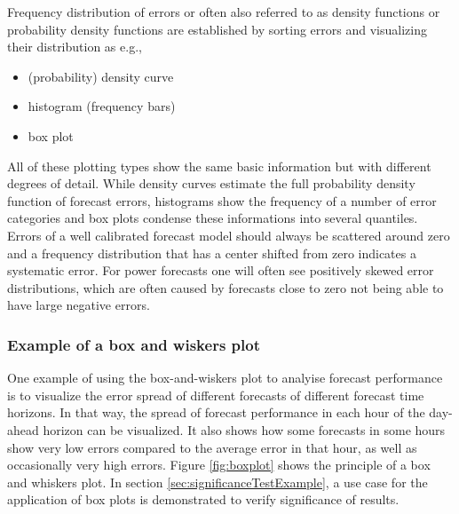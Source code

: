 Frequency distribution of errors or often also referred to as density functions or probability density functions are established by sorting errors and visualizing their distribution as e.g.,  
\begin{itemize}
    \item (probability) density curve 
    \item histogram (frequency bars)  
    \item box plot
\end{itemize}
All of these plotting types show the same basic information but with different degrees of detail.
While density curves estimate the full probability density function of forecast errors, histograms show the frequency of a number of error categories and box plots condense these informations into several quantiles.
Errors of a well calibrated forecast model should always be scattered around zero and a frequency distribution that has a center shifted from zero indicates a systematic error.
For power forecasts one will often see positively skewed error distributions, which are often caused by forecasts close to zero not being able to have large negative errors.

\subsubsection{Example of a box and wiskers plot}\label{subsec:boxplot}

One example of using the box-and-wiskers plot to analyise forecast performance is to visualize the error spread of different forecasts of different forecast time horizons. In that way, the spread of forecast performance in each hour of the day-ahead horizon can be visualized. It also shows how some forecasts in some hours show very low errors compared to the average error in that hour, as well as occasionally very high errors. Figure \ref{fig:boxplot} shows the principle of a box and whiskers plot. In section \ref{sec:significanceTestExample}, a use case for the application of box plots is demonstrated to verify significance of results. 

